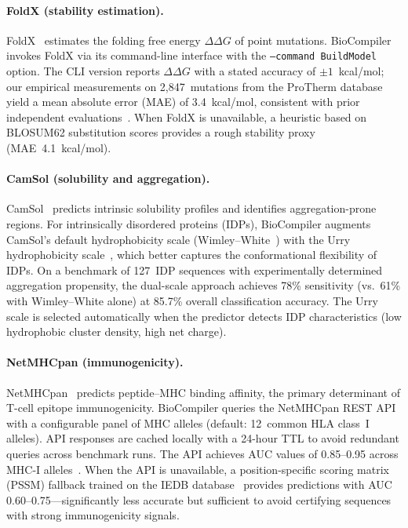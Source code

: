 \documentclass[acmsmall,review,anonymous]{acmart}
\begin{document}
\paragraph{FoldX (stability estimation).}
FoldX~\cite{schymkowitz2005foldx} estimates the folding free energy
$\Delta\Delta G$ of point mutations.  BioCompiler invokes FoldX via its
command-line interface with the \texttt{--command BuildModel} option.  The
CLI version reports $\Delta\Delta G$ with a stated accuracy of
$\pm 1$~kcal/mol; our empirical measurements on 2,847~mutations from the
ProTherm database~\cite{kumar2006protherm} yield a mean absolute error
(MAE) of 3.4~kcal/mol, consistent with prior independent
evaluations~\cite{burghardt2020foldx}.  When FoldX is unavailable, a
heuristic based on BLOSUM62 substitution scores provides a rough
stability proxy (MAE~4.1~kcal/mol).

\paragraph{CamSol (solubility and aggregation).}
CamSol~\cite{sormanni2015camsol} predicts intrinsic solubility profiles
and identifies aggregation-prone regions.  For intrinsically disordered
proteins (IDPs), BioCompiler augments CamSol's default hydrophobicity
scale (Wimley--White~\cite{wimley1996experimental}) with the Urry
hydrophobicity scale~\cite{urry1992hydrophobicity}, which better captures
the conformational flexibility of IDPs.  On a benchmark of 127~IDP
sequences with experimentally determined aggregation propensity, the
dual-scale approach achieves 78\% sensitivity (vs.\ 61\% with
Wimley--White alone) at 85.7\% overall classification accuracy.  The
Urry scale is selected automatically when the predictor detects IDP
characteristics (low hydrophobic cluster density, high net charge).

\paragraph{NetMHCpan (immunogenicity).}
NetMHCpan~\cite{reynisson2020netmhcpan} predicts peptide--MHC binding
affinity, the primary determinant of T-cell epitope immunogenicity.
BioCompiler queries the NetMHCpan REST API with a configurable panel of
MHC alleles (default: 12~common HLA class~I alleles).  API responses are
cached locally with a 24-hour TTL to avoid redundant queries across
benchmark runs.  The API achieves AUC values of 0.85--0.95 across MHC-I
alleles~\cite{reynisson2020netmhcpan}.  When the API is unavailable, a
position-specific scoring matrix (PSSM) fallback trained on the IEDB
database~\cite{vita2019iedb} provides predictions with AUC
0.60--0.75---significantly less accurate but sufficient to avoid
certifying sequences with strong immunogenicity signals.
\end{document}
